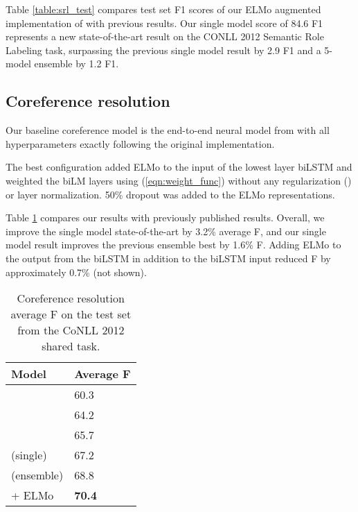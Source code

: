 \documentclass[11pt,a4paper]{article}
\newcommand{\ELMO}{ELMo}
\begin{document}
Table \ref{table:srl_test} compares test set F1 scores of our \ELMO{} augmented implementation of \citep{He2017DeepSR} with previous results. Our single model score of 84.6 F1 represents a new state-of-the-art result on the CONLL 2012 Semantic Role Labeling task, surpassing the previous single model result by 2.9 F1 and a 5-model ensemble by 1.2 F1.



\subsection{Coreference resolution}
Our baseline coreference model is the end-to-end neural model from \citet{Lee2017EndtoendNC} with all hyperparameters exactly following the original implementation.

The best configuration added \ELMO{} to the input of the lowest layer biLSTM and weighted the biLM layers using (\ref{eqn:weight_func}) without any regularization () or layer normalization.
50\% dropout was added to the \ELMO{} representations.

Table \ref{table:coref} compares our results with previously published results.  Overall, we improve the single model state-of-the-art by 3.2\% average F, and our single model result improves the previous ensemble best by 1.6\% F.  Adding \ELMO{} to the output from the biLSTM in addition to the biLSTM input reduced F by approximately 0.7\% (not shown).



\begin{table}
\centering
\begin{tabular}{l|l}
\textbf{Model}                                & \textbf{Average F} \\ \hline \hline
\citet{Durrett2013EasyVA}   & 60.3 \\
\citet{Wiseman2016LearningGF}                & 64.2     \\
\citet{Clark2016DeepRL}                  & 65.7      \\
\citet{Lee2017EndtoendNC} (single) & 67.2         \\
\citet{Lee2017EndtoendNC} (ensemble) & 68.8         \\
\citet{Lee2017EndtoendNC} + \ELMO             & \textbf{70.4}       \\
\end{tabular}
\caption{Coreference resolution average F on the test set from the CoNLL 2012 shared task.
}
\label{table:coref}
\end{table}
\end{document}
